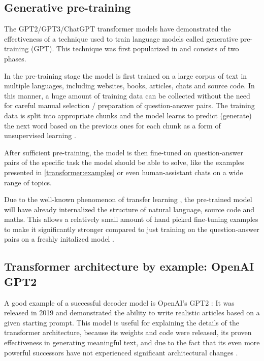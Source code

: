 \subsection{Generative pre-training}

The GPT2/GPT3/ChatGPT transformer models have demonstrated the effectiveness of a technique used to train language models called generative pre-training (GPT). This technique was first popularized in \cite{improvinglu} and consists of two phases.

In the pre-training stage the model is first trained on a large corpus of text in multiple languages, including websites, books, articles, chats and source code. In this manner, a huge amount of training data can be collected without the need for careful manual selection / preparation of question-answer pairs. The training data is split into appropriate chunks and the model learns to predict (generate) the next word based on the previous ones for each chunk as a form of unsupervised learning .

After sufficient pre-training, the model is then fine-tuned on question-answer pairs of the specific task the model should be able to solve, like the examples presented in \cref{transformer:examples} or even human-assistant chats on a wide range of topics.

Due to the well-known phenomenon of transfer learning \cite{transferlearning}, the pre-trained model will have already internalized the structure of natural language, source code and maths. 
This allows a relatively small amount of hand picked fine-tuning examples to make it significantly stronger compared to just training on the question-answer pairs on a freshly initalized model .

\subsection{Transformer architecture by example: OpenAI GPT2}

A good example of a successful decoder model is OpenAI's GPT2 \cite{unsupervisedmultitask} \cite{OpenAI2019BetterLM} \cite[source code]{HuggingFaceGPT2}: It was released in 2019 and demonstrated the ability to write realistic articles based on a given starting prompt. This model is useful for explaining the details of the transformer architecture, because its weights and code were released, its proven effectiveness in generating meaningful text, and due to the fact that its even more powerful successors have not experienced significant architectural changes \cite{OpenGenus2023GPTComparison}.

